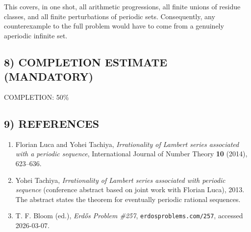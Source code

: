 This covers, in one shot, all arithmetic progressions, all finite unions of residue classes, and all finite perturbations of periodic sets. Consequently, any counterexample to the full problem would have to come from a genuinely aperiodic infinite set.

\subsection*{8) COMPLETION ESTIMATE (MANDATORY)}
COMPLETION: 50\%

\subsection*{9) REFERENCES}
\begin{enumerate}
\item Florian Luca and Yohei Tachiya, \emph{Irrationality of Lambert series associated with a periodic sequence}, International Journal of Number Theory \textbf{10} (2014), 623--636.
\item Yohei Tachiya, \emph{Irrationality of Lambert series associated with periodic sequence} (conference abstract based on joint work with Florian Luca), 2013. The abstract states the theorem for eventually periodic rational sequences.
\item T. F. Bloom (ed.), \emph{Erd\H{o}s Problem \#257}, \texttt{erdosproblems.com/257}, accessed 2026-03-07.
\end{enumerate}

